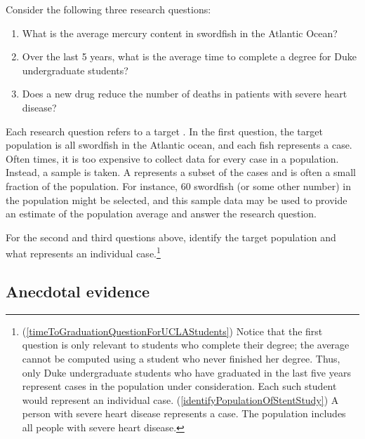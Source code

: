 Consider the following three research questions:
\begin{enumerate}
\setlength{\itemsep}{0mm}
\item What is the average mercury content in swordfish in the Atlantic Ocean?
\item\label{timeToGraduationQuestionForUCLAStudents} Over the last 5 years, what is the average time to complete a degree for Duke undergraduate students?
\item\label{identifyPopulationOfStentStudy} Does a new drug reduce the number of deaths in patients with severe heart disease?
\end{enumerate}
Each research question refers to a target . In the first question, the target population is all swordfish in the Atlantic ocean, and each fish represents a case. Often times, it is too expensive to collect data for every case in a population. Instead, a sample is taken. A  represents a subset of the cases and is often a small fraction of the population. For instance, 60 swordfish (or some other number) in the population might be selected, and this sample data may be used to provide an estimate of the population average and answer the research question.

\begin{exercise} \label{identifyingThePopulationForTwoQuestionsInPopAndSampSubsection}
For the second and third questions above, identify the target population and what represents an individual case.\footnote{(\ref{timeToGraduationQuestionForUCLAStudents}) Notice that the first question is only relevant to students who complete their degree; the average cannot be computed using a student who never finished her degree. Thus, only Duke undergraduate students who have graduated in the last five years represent cases in the population under consideration. Each such student would represent an individual case. (\ref{identifyPopulationOfStentStudy}) A person with severe heart disease represents a case. The population includes all people with severe heart disease.}
\end{exercise}


\subsection{Anecdotal evidence}
\label{anecdotalEvidenceSubsection}

